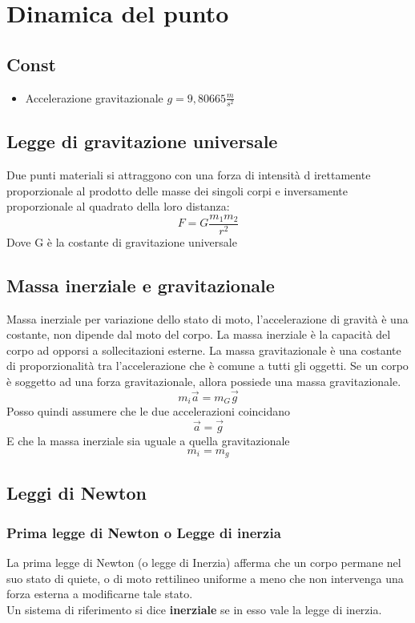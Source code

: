 \documentclass[a4paper]{report}
\begin{document}
  \chapter{Dinamica del punto}

  \section{Const}
  \begin{itemize}
    \item Accelerazione gravitazionale $g = 9,80665 \frac{m}{s^2}$
  \end{itemize}


  \section{Legge di gravitazione universale}
  Due punti materiali si attraggono con una forza di intensità d irettamente proporzionale al prodotto delle masse dei singoli corpi e inversamente proporzionale al quadrato della loro distanza:
  $$ F = G \frac{m_1 m_2}{r^2} $$
  Dove G è la costante di gravitazione universale

  \section{Massa inerziale e gravitazionale}
  Massa inerziale per variazione dello stato di moto, l'accelerazione di gravità è una costante, non dipende dal moto del corpo. La massa inerziale è la capacità del corpo ad opporsi a sollecitazioni esterne. La massa gravitazionale è una costante di proporzionalità tra l'accelerazione che è comune a tutti gli oggetti. Se un corpo è soggetto ad una forza gravitazionale, allora possiede una massa gravitazionale.
  $$ m_i \vec{a} = m_G \vec{g} $$
  Posso quindi assumere che le due accelerazioni coincidano
  $$ \vec{a} = \vec{g} $$
  E che la massa inerziale sia uguale a quella gravitazionale
  $$ m_i = m_g$$

  \section{Leggi di Newton}
  \subsection{Prima legge di Newton o Legge di inerzia}
  La prima legge di Newton (o legge di Inerzia) afferma che un corpo permane nel suo stato di quiete, o di moto rettilineo uniforme a meno che non intervenga una forza esterna a modificarne tale stato.\\
  Un sistema di riferimento si dice \textbf{inerziale} se in esso vale la legge di inerzia.
\end{document}
